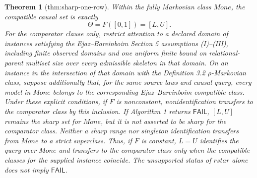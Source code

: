 \documentclass{article}
\newtheorem{theorem}{Theorem}
\begin{document}
\begin{theorem}[thm:sharp-one-row]\label{thm:sharp-one-row}
Within the fully Markovian class \(Mone\), the compatible causal set is exactly
\[
 \Theta=F([0,1])=[L,U].
\]
For the comparator clause only, restrict attention to a declared domain of instances satisfying the Ejaz--Bareinboim Section 5 assumptions (I)--(III), including finite observed domains and one uniform finite bound on relational-parent multiset size over every admissible skeleton in that domain.  On an instance in the intersection of that domain with the Definition 3.2 \(\rho\)-Markovian class, suppose additionally that, for the same source laws and causal query, every model in \(Mone\) belongs to the corresponding Ejaz--Bareinboim compatible class.  Under these explicit conditions, if \(F\) is nonconstant, nonidentification transfers to the comparator class by this inclusion.  If Algorithm 1 returns \(\mathsf{FAIL}\), \([L,U]\) remains the sharp set for \(Mone\), but it is not asserted to be sharp for the comparator class.  Neither a sharp range nor singleton identification transfers from \(Mone\) to a strict superclass.  Thus, if \(F\) is constant, \(L=U\) identifies the query over \(Mone\) and transfers to the comparator class only when the compatible classes for the supplied instance coincide.  The unsupported status of \(rstar\) alone does not imply \(\mathsf{FAIL}\).
\end{theorem}
\end{document}
